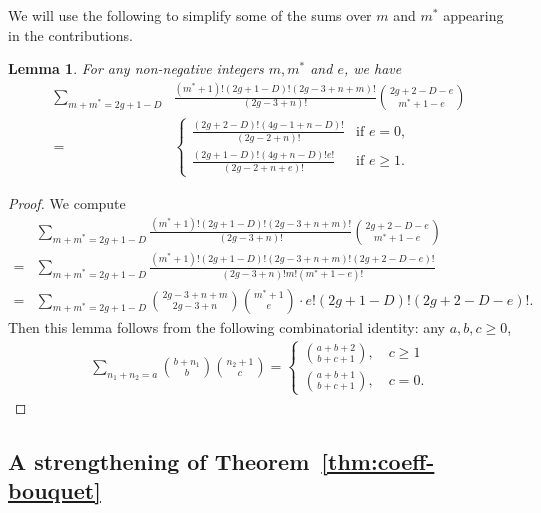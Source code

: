 \documentclass[12pt,reqno]{amsart}
\theoremstyle{plain}
\newtheorem{lemma}[theorem]{Lemma}
\theoremstyle{definition}
\theoremstyle{remark}
\begin{document}
We will use the following to simplify some of the sums over $m$ and $m^*$ appearing in the contributions.
\begin{lemma}
  \label{lem:sum-mm}For any non-negative integers $m,m^*$ and $e$, we have
  \begin{align*}
    \sum_{m + m^* = 2g + 1 - D} &\frac{(m^* + 1)!(2g + 1 - D)!(2g - 3 + n + m)!}{(2g - 3 + n)!} \binom{2g + 2 - D - e}{m^* + 1 - e} \\
    = &
        \begin{cases}
          \frac{(2g + 2 - D)!(4g - 1 + n - D)!}{(2g - 2 + n)!} & \text{if } e = 0, \\
          \frac{(2g + 1 - D)! (4g + n - D)! e!}{(2g - 2 + n + e)!} & \text{if } e \ge 1.
        \end{cases}
  \end{align*}
\end{lemma}
\begin{proof}
  We compute
  \begin{align*}
    &\sum_{m + m^* = 2g + 1 - D}\frac{(m^* + 1)!(2g + 1 - D)!(2g - 3 + n + m)!}{(2g - 3 + n)!} \binom{2g + 2 - D - e}{m^* + 1 - e} \\
    = &\sum_{m + m^* = 2g + 1 - D}\frac{(m^* + 1)! (2g + 1 - D)! (2g - 3 + n + m)! (2g + 2 - D - e)!}{(2g - 3 + n)! m! (m^* + 1 - e)!} \\
    = &\sum_{m + m^* = 2g + 1 - D} \binom{2g - 3 + n + m}{2g - 3 + n} \binom{m^* + 1}{e} \cdot e! (2g + 1 - D)! (2g + 2 - D - e)!.
  \end{align*}
Then this lemma follows from the following combinatorial identity:  any $a,b,c\geq0$,
    \begin{align*}
    \sum_{n_1+n_2=a}\binom{b+n_1}{b}\binom{n_2+1}{c}=
    \begin{cases}
    \binom{a+b+2}{b+c+1},    \quad c\geq1 
    \\
    \binom{a+b+1}{b+c+1},    \quad c=0
    .\end{cases}\end{align*}  
\end{proof}

\subsection{A strengthening of Theorem~\ref{thm:coeff-bouquet}}
\end{document}
